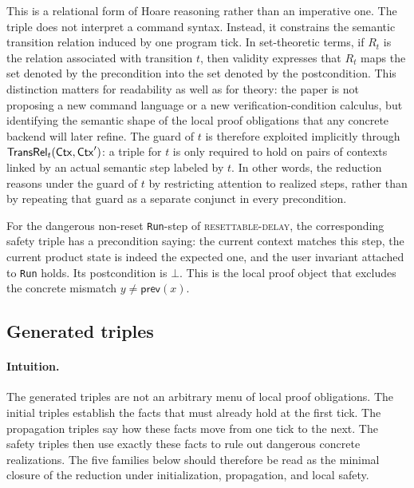 \documentclass[acmsmall,screen]{acmart}
\theoremstyle{leftplain}
\theoremstyle{leftdefinition}
\theoremstyle{leftremark}
\begin{document}
This is a relational form of Hoare reasoning rather than an imperative one. The
triple does not interpret a command syntax. Instead, it constrains the semantic
transition relation induced by one program tick. In set-theoretic terms, if
$R_t$ is the relation associated with transition $t$, then validity expresses
that $R_t$ maps the set denoted by the precondition into the set denoted by the
postcondition. This distinction matters for readability as well as for theory:
the paper is not proposing a new command language or a new
verification-condition calculus, but identifying the semantic shape of the
local proof obligations that any concrete backend will later refine.
The guard of $t$ is therefore exploited implicitly through
$\mathsf{TransRel}_t(\mathsf{Ctx},\mathsf{Ctx}')$: a triple for $t$ is only required to hold on pairs
of contexts linked by an actual semantic step labeled by $t$. In other words,
the reduction reasons under the guard of $t$ by restricting attention to
realized steps, rather than by repeating that guard as a separate conjunct in
every precondition.

\noindent{}
For the dangerous non-reset \texttt{Run}-step of \textsc{resettable-delay}, the
corresponding safety triple has a precondition saying: the current context
matches this step, the current product state is indeed the expected one, and
the user invariant attached to \texttt{Run} holds. Its postcondition is
$\bot$. This is the local proof object that excludes the concrete mismatch
$y \neq \mathsf{prev}(x)$.

\subsection{Generated triples}
\paragraph{Intuition.}
The generated triples are not an arbitrary menu of local proof obligations. The
initial triples establish the facts that must already hold at the first tick.
The propagation triples say how these facts move from one tick to the next. The
safety triples then use exactly these facts to rule out dangerous concrete
realizations. The five families below should therefore be read as the minimal
closure of the reduction under initialization, propagation, and local safety.
\end{document}
